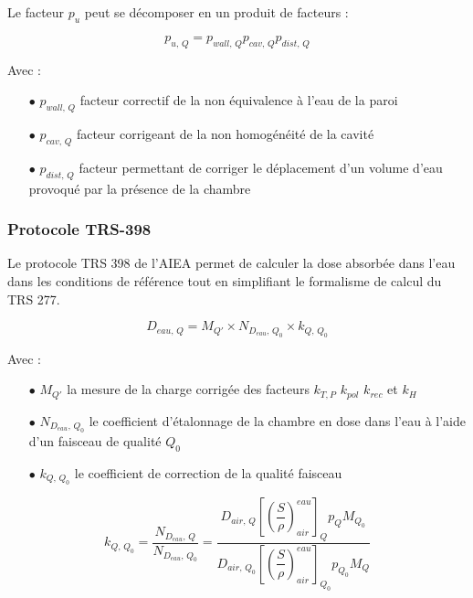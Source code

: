 \documentclass{article}
\begin{document}
Le facteur $p_u$ peut se décomposer en un produit de facteurs :

\begin{equation}
  p_{u,\, Q} = p_{wall,\, Q} p_{cav,\, Q} p_{dist,\, Q}
  \label{eq_pu}
\end{equation}

Avec :
\begin{itemize}
  \item[$\bullet$] $p_{wall,\, Q}$ facteur correctif de la non équivalence à l'eau de la paroi
  \item[$\bullet$] $p_{cav,\, Q}$ facteur corrigeant de la non homogénéité de la cavité
  \item[$\bullet$] $p_{dist,\, Q}$ facteur permettant de corriger le déplacement d'un volume d'eau provoqué par la présence de la chambre
\end{itemize}

\subsubsection{Protocole TRS-398}

Le protocole TRS 398 de l'AIEA \cite{international2001iaea} permet de calculer la dose absorbée dans l'eau dans les conditions de référence tout en simplifiant le formalisme de calcul du TRS 277.

\begin{equation}
  D_{eau,\, Q} = M_{Q'} \times N_{D_{eau},\, Q_0} \times k_{Q,\, Q_0}
  \label{eq_dose_398}
\end{equation}

Avec :
\begin{itemize}
  \item[$\bullet$] $M_{Q'}$ la mesure de la charge corrigée des facteurs $k_{T,P}$ $k_{pol}$ $k_{rec}$ et $k_H$
  \item[$\bullet$] $N_{D_{eau},\, Q_0}$ le coefficient d'étalonnage de la chambre en dose dans l'eau à l'aide d'un faisceau de qualité $Q_0$ 
  \item[$\bullet$] $k_{Q,\, Q_0}$ le coefficient de correction de la qualité faisceau
\end{itemize}

\begin{equation}
  k_{Q,\, Q_0} = \dfrac{N_{D_{eau},\, Q}}{N_{D_{eau},\, Q_0}} = \dfrac{D_{air,\, Q} \left[\left(\dfrac{S}{\rho}\right) ^{eau}_{air}\right]_Q p_Q M_{Q_0}}{D_{air,\, Q_0 } \left[\left(\dfrac{S}{\rho}\right) ^{eau}_{air}\right]_{Q_0} p_{Q_0} M_Q}
\end{equation}
\end{document}
